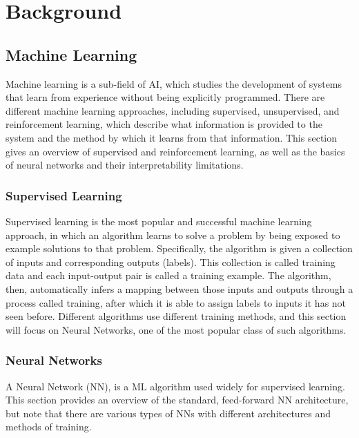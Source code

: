 \chapter{Background}
\section{Machine Learning}
Machine learning is a sub-field of AI, which studies the development of systems that learn from experience without being explicitly programmed. There are different machine learning approaches, including supervised, unsupervised, and reinforcement learning, which describe what information is provided to the system and the method by which it learns from that information. This section gives an overview of supervised and reinforcement learning, as well as the basics of neural networks and their interpretability limitations.

\subsection{Supervised Learning}
Supervised learning is the most popular and successful machine learning approach, in which an algorithm learns to solve a problem by being exposed to example solutions to that problem. Specifically, the algorithm is given a collection of inputs and corresponding outputs (labels). This collection is called training data and each input-output pair is called a training example. The algorithm, then, automatically infers a mapping between those inputs and outputs through a process called training, after which it is able to assign labels to inputs it has not seen before. Different algorithms use different training methods, and this section will focus on Neural Networks, one of the most popular class of such algorithms.

\subsection{Neural Networks}
A Neural Network (NN), is a ML algorithm used widely for supervised learning. This section provides an overview of the standard, feed-forward NN architecture, but note that there are various types of NNs with different architectures and methods of training.

